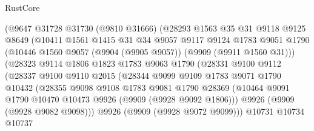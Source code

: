 \begin{lexlean}{RustCore}
\begin{coremodule}
                      (@9647
                        @31728
                        @31730
                        (@9810 @31666)
                        (@28293
                          @1563
                          @35
                          @31
                          @9118
                          @9125
                          @8649
                          (@10411
                            @1561
                            @1415
                            @31
                            @34
                            @9057
                            @9117
                            @9124
                            @1783
                            @9051
                            @1790
                            (@10446 @1560 @9057 (@9904 (@9905 @9057)) (@9909 (@9911 @1560 @31)))
                            (@28323
                              @9114
                              @1806
                              @1823
                              @1783
                              @9063
                              @1790
                              (@28331
                                @9100
                                @9112
                                (@28337
                                  @9100
                                  @9110
                                  @2015
                                  (@28344
                                    @9099
                                    @9109
                                    @1783
                                    @9071
                                    @1790
                                    @10432
                                    (@28355
                                      @9098
                                      @9108
                                      @1783
                                      @9081
                                      @1790
                                      @28369
                                      (@10464
                                        @9091
                                        @1790
                                        @10470
                                        @10473
                                        @9926
                                        (@9909 (@9928 @9092 @1806)))
                                      @9926
                                      (@9909 (@9928 @9082 @9098)))
                                    @9926
                                    (@9909 (@9928 @9072 @9099)))
                                  @10731
                                  @10734
                                  @10737

\end{coremodule}
\end{lexlean}
